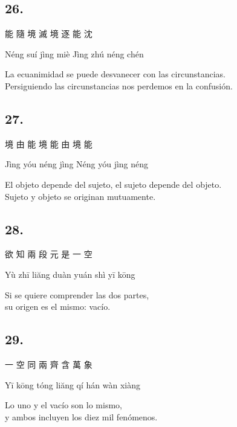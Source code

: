 \documentclass[
  a5paperpaper,
]{article}
\begin{document}
\begin{verseblock}

\hypertarget{section-100}{%
\subsection{26.}\label{section-100}}

能 隨 境 滅 境 逐 能 沈

Néng suí jìng miè Jìng zhú néng chén

La ecuanimidad se puede desvanecer con las circunstancias.\\
Persiguiendo las circunstancias nos perdemos en la confusión.

\end{verseblock}

\begin{verseblock}

\hypertarget{section-101}{%
\subsection{27.}\label{section-101}}

境 由 能 境 能 由 境 能

Jìng yóu néng jìng Néng yóu jìng néng

El objeto depende del sujeto, el sujeto depende del objeto.\\
Sujeto y objeto se originan mutuamente.

\end{verseblock}

\begin{verseblock}

\hypertarget{section-102}{%
\subsection{28.}\label{section-102}}

欲 知 兩 段 元 是 一 空

Yù zhī liăng duàn yuán shì yī kōng

Si se quiere comprender las dos partes,\\
su origen es el mismo: vacío.

\end{verseblock}

\begin{verseblock}

\hypertarget{section-103}{%
\subsection{29.}\label{section-103}}

一 空 同 兩 齊 含 萬 象

Yī kōng tóng liăng qí hán wàn xiàng

Lo uno y el vacío son lo mismo,\\
y ambos incluyen los diez mil fenómenos.

\end{verseblock}
\end{document}
